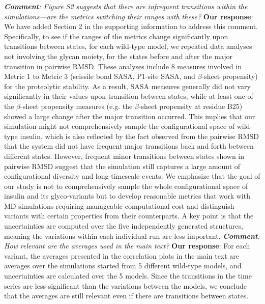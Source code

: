 \documentclass[sn-vancouver]{sn-jnl}
\begin{document}
\newline
\newline
\indent
\textit{\textbf{Comment}:
Figure S2 suggests that there are infrequent transitions within the simulations---are the metrics switching their ranges with these?}
\newline
\indent 
{\bf Our response}: 
We have added Section 2 in the supporting information to address this comment. Specifically, to see if the ranges of the metrics change significantly upon transitions between states, for each wild-type model, we repeated data analyses not involving the glycan moiety, for the states before and after the major transition in pairwise RMSD. These analyses include 8 measures involved in Metric 1 to Metric 3 (scissile bond SASA, P1-site SASA, and $\beta$-sheet propensity) for the proteolytic stability. As a result, SASA measures generally did not vary significantly in their values upon transition between states, while at least one of the $\beta$-sheet propensity measures (e.g. the $\beta$-sheet propensity at residue B25) showed a large change after the major transition occurred. This implies that our simulation might not comprehensively sample the configurational space of wild-type insulin, which is also reflected by the fact observed from the pairwise RMSD that the system did not have frequent major transitions back and forth between different states. However, frequent minor transitions between states shown in pairwise RMSD suggest that the simulation still captures a large amount of configurational diversity and long-timescale events. We emphasize that the goal of our study is not to comprehensively sample the whole configurational space of insulin and its glyco-variants but to develop reasonable metrics that work with MD simulations requiring manageable computational cost and distinguish variants with certain properties from their counterparts.  A key point is that the uncertainties are computed over the five independently generated structures, meaning the variations within each individual run are less important. 
\newline
\newline
\indent
\textit{\textbf{Comment}:
How relevant are the averages used in the main text?}
\newline
\indent 
{\bf Our response}: 
For each variant, the averages presented in the correlation plots in the main text are averages over the simulations started from 5 different wild-type models, and uncertainties are calculated over the 5 models. Since the transitions in the time series are less significant than the variations between the models, we conclude that the averages are still relevant even if there are transitions between states.
\end{document}
